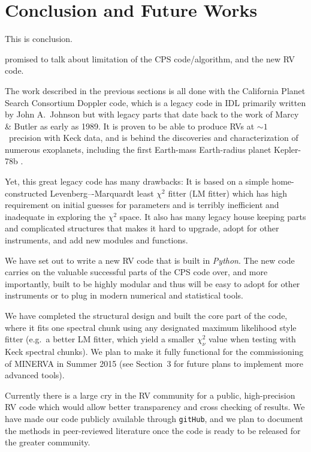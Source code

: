 \chapter{Conclusion and Future Works}\label{chap:conclusion}

This is conclusion.

promised to talk about limitation of the CPS code/algorithm, and the
new RV code.

The work described in the previous sections is all done with the
California Planet Search Consortium Doppler code, which is a legacy
code in IDL primarily written by John A.\ Johnson but with legacy
parts that date back to the work of Marcy \& Butler as early as
1989. It is proven to be able to produce RVs at $\sim 1$
\mps\ precision with Keck data, and is behind the discoveries and
characterization of numerous exoplanets, including the first
Earth-mass Earth-radius planet Kepler-78b \citep{howard2013,pepe2013}.

Yet, this great legacy code has many drawbacks: It is based on a
simple home-constructed Levenberg–-Marquardt least $\chi^2$ fitter
(LM fitter) which has high requirement on initial guesses for
parameters and is terribly inefficient and inadequate in exploring the
$\chi^2$ space. It also has many legacy house keeping parts and
complicated structures that makes it hard to upgrade, adopt for other
instruments, and add new modules and functions.

We have set out to write a new RV code that is built in {\it Python}.
The new code carries on the valuable successful parts of the CPS code
over, and more importantly, built to be highly modular and thus will
be easy to adopt for other instruments or to plug in modern
numerical and statistical tools.

We have completed the structural design and built the core part of the
code, where it fits one spectral chunk using any designated maximum
likelihood style fitter (e.g.\ a better LM fitter, which yield a
smaller $\chi^2_\nu$ value when testing with Keck spectral chunks). We
plan to make it fully functional for the commissioning of MINERVA in
Summer 2015 (see Section~3 for future plans to implement more
advanced tools).

Currently there is a large cry in the RV community for a public,
high-precision RV code which would allow better transparency and cross
checking of results. We have made our code publicly available through
{\tt gitHub}, and we plan to document the methods in peer-reviewed
literature once the code is ready to be released for the greater
community.

